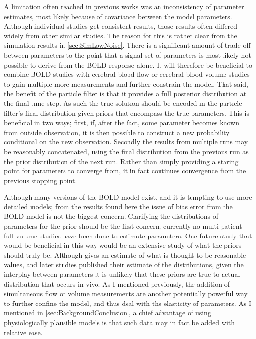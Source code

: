 A limitation often reached in previous works was an inconsistency of
parameter estimates, most likely because of covariance between the model parameters.
Although individual studies got consistent results, those results often differed
widely from other similar studies. The reason for this is rather clear from the
simulation results in \autoref{sec:SimLowNoise}. There is a significant amount of
trade off between parameters to the point that a signal set of parameters
is most likely not possible to derive from the BOLD response alone. It
will therefore be beneficial to combine BOLD studies with cerebral blood
flow or cerebral blood volume studies to gain multiple more measurements and
further constrain the model. That said, the benefit of the particle filter
is that it provides a full posterior distribution at the final time step.
As such the true solution should be encoded in the particle filter's final 
distribution given priors that encompass the true parameters. This is beneficial
in two ways; first, if, after the fact, some parameter becomes known 
from outside observation, it is then possible to construct a new probability
conditional on the new observation. Secondly the results from multiple runs
may be reasonably concatenated, using the final distribution from the previous
run as the prior distribution of the next run. Rather than simply providing a 
staring point for parameters to converge from, it in fact continues convergence
from the previous stopping point. 

Although many versions of the BOLD model exist, and it is tempting to use 
more detailed models; from the results found here the issue of bias error
from the BOLD model is not the biggest concern. Clarifying the distributions
of parameters for the prior should be the first concern; currently no multi-patient
full-volume studies have been done to estimate parameters.
One future study that would be beneficial in this way  would
be an extensive study of what the priors should truly be. Although \cite{Friston2000}
gives an estimate of what is thought to be reasonable values, and later studies
published their estimate of the distributions, given the interplay between
parameters it is unlikely that these priors are true to actual distribution
that occurs in vivo. As I mentioned previously, the addition of simultaneous
flow or volume measurements are another potentially powerful way to further confine the model,
and thus deal with the elasticity of parameters. As I mentioned in 
\autoref{sec:BackgroundConclusion}, a chief advantage of using physiologically
plausible models is that such data may in fact be added with relative ease.

